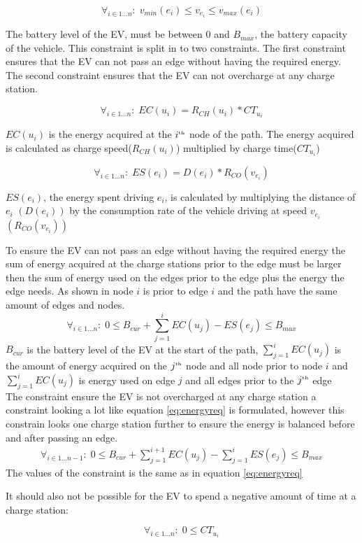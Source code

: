 \begin{equation}
\forall_{i\in1 \dots n }:\;v_{min}(e_i) \leq v_{e_i} \leq v_{max}(e_i)
\end{equation}

The battery level of the EV, must be between $0$ and $B_{max}$, the battery capacity of the vehicle.
This constraint is split in to two constraints. The first constraint ensures that the EV can not pass an edge without having the required energy. The second constraint ensures that the EV can not overcharge at any charge station.

\begin{equation}
\forall_{i\in1 \dots n }:\; EC(u_i) = R_{CH}(u_i) * CT_{u_i}
\end{equation}

$EC(u_i)$ is the energy acquired at the $i^{\text{\tiny th}}$ node of the path. The energy acquired is calculated as charge speed($R_{CH}(u_i)$) multiplied by charge time($CT_{u_i}$)

\begin{equation}
\forall_{i\in1 \dots n }:\; ES(e_i) = D(e_i)*R_{CO}(v_{e_i})
\end{equation}

$ES(e_i)$, the energy spent driving $e_i$, is calculated by multiplying the distance of $e_i$ $(D(e_i))$ by the consumption rate of the vehicle driving at speed $v_{e_i}$ $(R_{CO}(v_{e_i}))$

To ensure the EV can not pass an edge without having the required energy the sum of energy acquired at the charge stations prior to the edge must be larger then the sum of energy used on the edges prior to the edge plus the energy the edge needs. As shown in  node $i$ is prior to edge $i$ and the path have the same amount of edges and nodes.
\begin{equation}
\forall_{i\in1 \dots n }:\;0 \leq B_{cur} + \sum_{j=1}^{i} EC(u_j) - ES(e_j) \leq B_{max}
\end{equation}\label{eq:energyreq}
$B_{cur}$ is the battery level of the EV at the start of the path, $ \sum_{j=1}^{i} EC(u_j)$ is the amount of energy acquired on the $j^{\text{\tiny th}}$ node and all node prior to node $i$ and $\sum_{j=1}^{i} EC(u_j)$ is energy used on edge $j$ and all edges prior to the $j^{\text{\tiny th}}$ edge \\

The constraint ensure the EV is not overcharged at any charge station a constraint looking a lot like equation \ref{eq:energyreq} is formulated, however this constrain looks one charge station further to ensure the energy is balanced before and after passing an edge.
\begin{equation}
\begin{aligned}
\forall_{i\in1 \dots n-1}:\;0 \leq B_{cur} + \sum_{j=1}^{i+1} EC(u_j) - \sum_{j=1}^{i} ES(e_j) \leq B_{max}
\end{aligned}
\end{equation}
The values of the constraint is the same as in equation \ref{eq:energyreq}

It should also not be possible for the EV to spend a negative amount of time at a charge station:

\begin{equation}
\forall_{i\in1 \dots n }:\; 0 \leq CT_{u_i}
\end{equation}